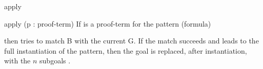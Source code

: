 \begin{tactic}{apply}
  \begin{tsyntax}[empty]{apply (p : proof-term)}
   If  is a proof-term for the pattern (formula)
  \begin{center}
  \end{center}
  \noindent then  tries to match B with the current G. If the
  match succeeds and leads to the full instantiation of the pattern,
  then the goal is replaced, after instantiation, with the $n$ subgoals
  .
  \end{tsyntax}
\end{tactic}
